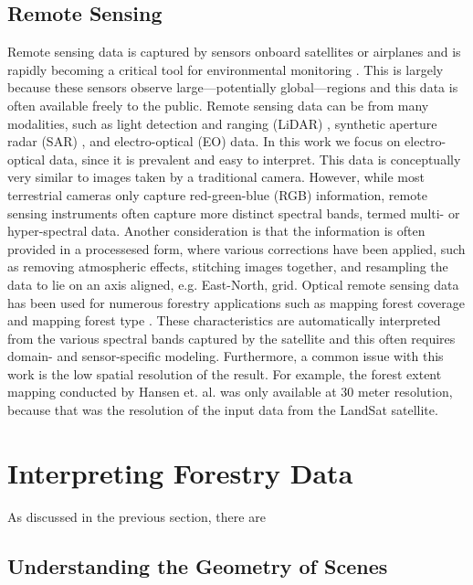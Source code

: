 \subsection{Remote Sensing}
Remote sensing data is captured by sensors onboard satellites or airplanes and is rapidly becoming a critical tool for environmental monitoring \cite{Parra2022RemoteMonitoring}. This is largely because these sensors observe large---potentially global---regions and this data is often available freely to the public. 
Remote sensing data can be from many modalities, such as light detection and ranging (LiDAR) \cite{LiDARForestryBeland2019}, synthetic aperture radar (SAR) \cite{Hall2020WhatEarthdata}, and electro-optical (EO) data.
In this work we focus on electro-optical data, since it is prevalent and easy to interpret. This data is conceptually very similar to images taken by a traditional camera. However, while most terrestrial cameras only capture red-green-blue (RGB) information, remote sensing instruments often capture more distinct spectral bands, termed multi- or hyper-spectral data. Another consideration is that the information is often provided in a processesed form, where various corrections have been applied, such as removing atmospheric effects, stitching images together, and resampling the data to lie on an axis aligned, e.g. East-North, grid. 
Optical remote sensing data has been used for numerous forestry applications such as mapping forest coverage \cite{ Hansen2013High-resolutionChange} and mapping forest type \cite{Kempeneers2011DataMapping}. These characteristics are automatically interpreted from the various spectral bands captured by the satellite and this often requires domain- and sensor-specific modeling. Furthermore, a common issue with this work is the low spatial resolution of the result. For example, the forest extent mapping conducted by Hansen et. al. \cite{Hansen2013High-resolutionChange} was only available at 30 meter resolution, because that was the resolution of the input data from the LandSat satellite.



\section{Interpreting Forestry Data}
As discussed in the previous section, there are 
\subsection{Understanding the Geometry of Scenes}
